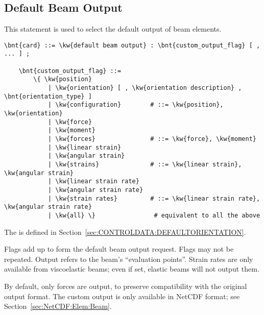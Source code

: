 \subsection{Default Beam Output}\label{sec:CONTROLDATA:DEFAULTBEAMOUTPUT}
This statement is used to select the default output of beam elements.
\begin{Verbatim}[commandchars=\\\{\}]
    \bnt{card} ::= \kw{default beam output} : \bnt{custom_output_flag} [ , ... ] ;

    \bnt{custom_output_flag} ::=
        \{ \kw{position}
            | \kw{orientation} [ , \kw{orientation description} , \bnt{orientation_type} ]
            | \kw{configuration}        # ::= \kw{position}, \kw{orientation}
            | \kw{force}
            | \kw{moment}
            | \kw{forces}               # ::= \kw{force}, \kw{moment}
            | \kw{linear strain}
            | \kw{angular strain}
            | \kw{strains}              # ::= \kw{linear strain}, \kw{angular strain}
            | \kw{linear strain rate}
            | \kw{angular strain rate}
            | \kw{strain rates}         # ::= \kw{linear strain rate}, \kw{angular strain rate}
            | \kw{all} \}                # equivalent to all the above
\end{Verbatim}
The  is defined
in Section~\ref{sec:CONTROLDATA:DEFAULTORIENTATION}.

Flags add up to form the default beam output request.
Flags may not be repeated.
Output refers to the beam's ``evaluation points''.
Strain rates are only available from viscoelastic beams;
even if set, elastic beams will not output them.

By default, only forces are output, to preserve compatibility
with the original output format.
The custom output is only available in NetCDF format;
see Section~\ref{sec:NetCDF:Elem:Beam}.



